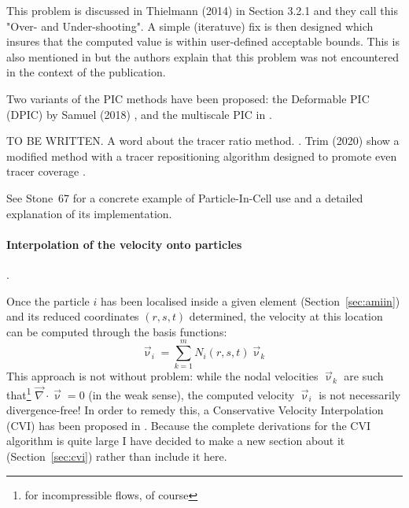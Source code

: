 This problem is discussed in Thielmann \etal (2014) in Section 3.2.1 and they 
call this "Over- and Under-shooting". A simple (iteratuve) 
fix is then designed which insures that the computed value is within user-defined 
acceptable bounds. This is also mentioned in \cite{galb19} but the authors 
explain that this problem was not encountered in the context of the publication.





\begin{remark}
Two variants of the PIC methods have been proposed: the Deformable PIC (DPIC) 
by Samuel (2018) \cite{samu18}, and the multiscale PIC in \cite{asmo12}.
\end{remark}

\begin{remark}
TO BE WRITTEN.
A word about the tracer ratio method. \cite{taki03}. 
Trim \etal (2020) show a modified method 
with a tracer repositioning algorithm designed to promote even tracer
coverage \cite{trlb20}. 
\end{remark}



See Stone~67 for a concrete example of Particle-In-Cell use and a detailed 
explanation of its implementation.



\paragraph{Interpolation of the velocity onto particles}.

Once the particle $i$ has been localised inside a given element (Section~\ref{sec:amiin}) 
and its reduced coordinates $(r,s,t)$ determined, the velocity at this location can 
be computed through the basis functions:
\[
\vec\upnu_i=\sum_{k=1}^m N_i(r,s,t) \vec\upnu_k
\]
This approach is not without problem: while the nodal velocities $\vec\upnu_k$ are such 
that\footnote{for incompressible flows, of course} 
$\vec\nabla\cdot\vec\upnu=0$ (in the weak sense), the computed velocity $\vec\upnu_i$ 
is not necessarily divergence-free! In order to remedy this, a 
Conservative Velocity Interpolation (CVI) has been proposed in \cite{waav15}.
Because the complete derivations for the CVI algorithm is quite large I 
have decided to make a new section about it (Section~\ref{sec:cvi}) rather than include it 
here.

